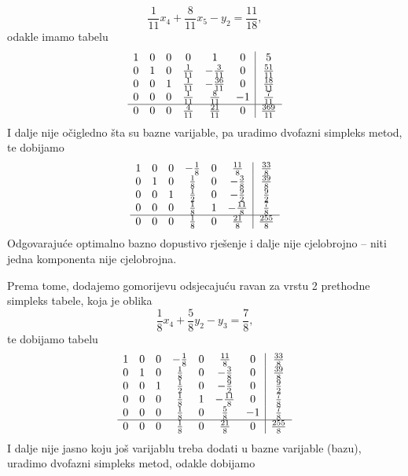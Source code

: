 \documentclass[a4paper, utf8, 11pt, colorlinks]{article}
\begin{document}
 $$ \frac{1}{11} x_4 + \frac{8}{11} x_5 - y_2 = \frac{11}{18},$$
 odakle imamo tabelu 
 $$\begin{array}{cccccc| c}
 1   &   0   &  0  &   0             &   1  &   0              &   5 \\
 0   &   1   &  0  &  \frac{1}{11}    &   -\frac{3}{11}    &  0 & \frac{51}{11} \\
 0   &   0   &  1  &  \frac{1}{11}    & -\frac{36}{11}       & 0 & \frac{18}{11}  \\
 0   &   0   &  0  &  \frac{1}{11}    &  \frac{8}{11}   & -1 & \frac{7}{11} \\ \hline
 0   &   0   &  0  &   \frac{4}{11}   &   \frac{21}{11} & 0 & \frac{369}{11}
\end{array} $$
I dalje nije očigledno šta su bazne varijable, pa uradimo dvofazni simpleks metod, te dobijamo 
 $$\begin{array}{cccccc| c}
1    &   0   &   0   &  -\frac{1}{8}   &   0    &    \frac{11}{8}    &  \frac{33}{8} \\
0    &   1   &   0   &   \frac{1}{8}   &   0    &    -\frac{3}{8}    & \frac{39}{8} \\
0    &   0   &   1   &   \frac{1}{2}   &   0    &    - \frac{9}{2}   & \frac{9}{2} \\
0    &   0   &   0   &   \frac{1}{8}   &   1    &    - \frac{11}{8}  & \frac{7}{8} \\ \hline
0    &   0   &   0   &   \frac{1}{8}   &   0    &     \frac{21}{8}   & \frac{255}{8}
\end{array} $$
Odgovarajuće optimalno bazno dopustivo rješenje i dalje nije cjelobrojno -- niti jedna komponenta nije cjelobrojna. 

Prema tome, dodajemo gomorijevu odsjecajuću ravan za vrstu 2 prethodne simpleks tabele, koja je oblika
$$  \frac{1}{8}x_4 + \frac{5}{8} y_2 - y_3 = \frac{7}{8},$$
te dobijamo tabelu
$$ \begin{array}{ccccccc| c}
1    &   0   &   0   &  -\frac{1}{8}   &   0    &    \frac{11}{8}    & 0 & \frac{33}{8} \\
0    &   1   &   0   &   \frac{1}{8}   &   0    &    -\frac{3}{8}    & 0 & \frac{39}{8} \\
0    &   0   &   1   &   \frac{1}{2}   &   0    &    - \frac{9}{2}   & 0 & \frac{9}{2} \\
0    &   0   &   0   &   \frac{1}{8}   &   1    &    - \frac{11}{8}  & 0    & \frac{7}{8} \\ 
0    &   0   &   0   &   \frac{1}{8}   &   0    &    \frac{5}{8}   & -1 & \frac{7}{8} \\ \hline
0    &   0   &   0   &   \frac{1}{8}   &   0    &     \frac{21}{8}   & 0 & \frac{255}{8}   
\end{array} $$
I dalje nije jasno koju još varijablu treba dodati u bazne varijable (bazu), uradimo dvofazni simpleks metod, odakle dobijamo 
\end{document}
